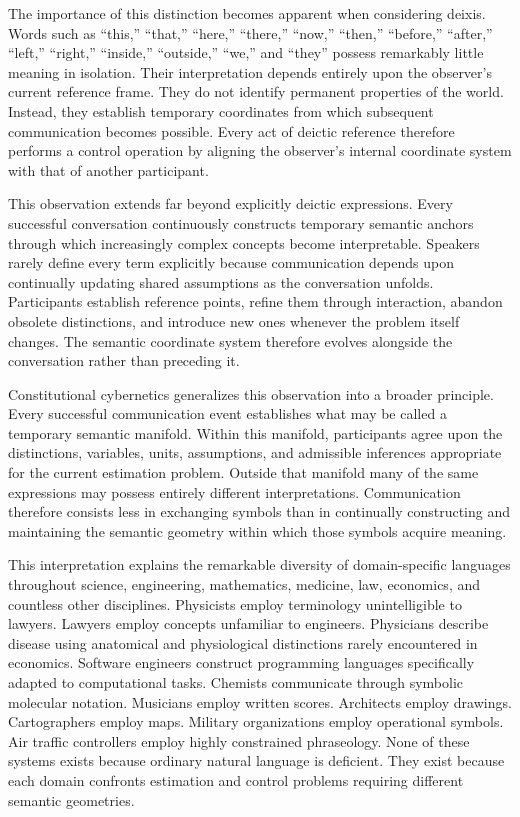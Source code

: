 \documentclass[12pt,a4paper]{article}
\begin{document}
The importance of this distinction becomes apparent when considering deixis. Words such as ``this,'' ``that,'' ``here,'' ``there,'' ``now,'' ``then,'' ``before,'' ``after,'' ``left,'' ``right,'' ``inside,'' ``outside,'' ``we,'' and ``they'' possess remarkably little meaning in isolation. Their interpretation depends entirely upon the observer's current reference frame. They do not identify permanent properties of the world. Instead, they establish temporary coordinates from which subsequent communication becomes possible. Every act of deictic reference therefore performs a control operation by aligning the observer's internal coordinate system with that of another participant.

This observation extends far beyond explicitly deictic expressions. Every successful conversation continuously constructs temporary semantic anchors through which increasingly complex concepts become interpretable. Speakers rarely define every term explicitly because communication depends upon continually updating shared assumptions as the conversation unfolds. Participants establish reference points, refine them through interaction, abandon obsolete distinctions, and introduce new ones whenever the problem itself changes. The semantic coordinate system therefore evolves alongside the conversation rather than preceding it.

Constitutional cybernetics generalizes this observation into a broader principle. Every successful communication event establishes what may be called a temporary semantic manifold. Within this manifold, participants agree upon the distinctions, variables, units, assumptions, and admissible inferences appropriate for the current estimation problem. Outside that manifold many of the same expressions may possess entirely different interpretations. Communication therefore consists less in exchanging symbols than in continually constructing and maintaining the semantic geometry within which those symbols acquire meaning.

This interpretation explains the remarkable diversity of domain-specific languages throughout science, engineering, mathematics, medicine, law, economics, and countless other disciplines. Physicists employ terminology unintelligible to lawyers. Lawyers employ concepts unfamiliar to engineers. Physicians describe disease using anatomical and physiological distinctions rarely encountered in economics. Software engineers construct programming languages specifically adapted to computational tasks. Chemists communicate through symbolic molecular notation. Musicians employ written scores. Architects employ drawings. Cartographers employ maps. Military organizations employ operational symbols. Air traffic controllers employ highly constrained phraseology. None of these systems exists because ordinary natural language is deficient. They exist because each domain confronts estimation and control problems requiring different semantic geometries.
\end{document}

